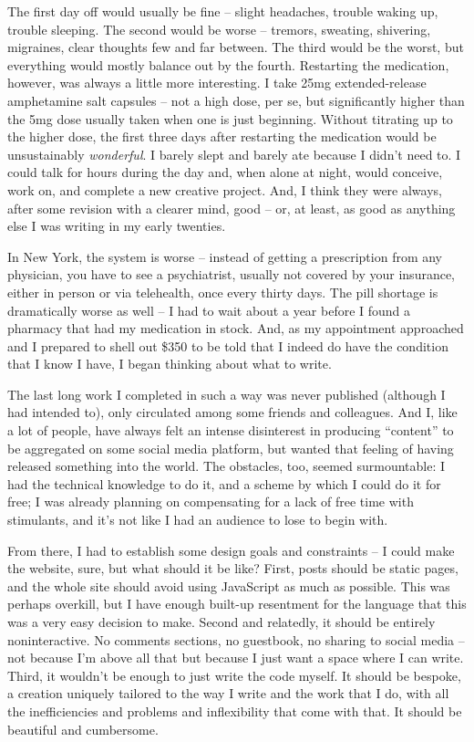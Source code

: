 \documentclass[11pt]{article}
\begin{document}
    The first day off would usually be fine -- slight headaches, trouble waking up, trouble sleeping. The second would be worse -- tremors, sweating, shivering, migraines, clear thoughts few and far between. The third would be the worst, but everything would mostly balance out by the fourth. Restarting the medication, however, was always a little more interesting. I take 25mg extended-release amphetamine salt capsules -- not a high dose, per se, but significantly higher than the 5mg dose usually taken when one is just beginning. Without titrating up to the higher dose, the first three days after restarting the medication would be unsustainably \textit{wonderful}. I barely slept and barely ate because I didn't need to. I could talk for hours during the day and, when alone at night, would conceive, work on, and complete a new creative project. And, I think they were always, after some revision with a clearer mind, good -- or, at least, as good as anything else I was writing in my early twenties. 

    In New York, the system is worse -- instead of getting a prescription from any physician, you have to see a psychiatrist, usually not covered by your insurance, either in person or via telehealth, once every thirty days. The pill shortage is dramatically worse as well -- I had to wait about a year before I found a pharmacy that had my medication in stock. And, as my appointment approached and I prepared to shell out \$350 to be told that I indeed do have the condition that I know I have, I began thinking about what to write.

    The last long work I completed in such a way was never published (although I had intended to), only circulated among some friends and colleagues. And I, like a lot of people, have always felt an intense disinterest in producing ``content'' to be aggregated on some social media platform, but wanted that feeling of having released something into the world. The obstacles, too, seemed surmountable: I had the technical knowledge to do it, and a scheme by which I could do it for free; I was already planning on compensating for a lack of free time with stimulants, and it's not like I had an audience to lose to begin with. 

    From there, I had to establish some design goals and constraints -- I could make the website, sure, but what should it be like? First, posts should be static pages, and the whole site should avoid using JavaScript as much as possible. This was perhaps overkill, but I have enough built-up resentment for the language that this was a very easy decision to make. Second and relatedly, it should be entirely noninteractive. No comments sections, no guestbook, no sharing to social media -- not because I'm above all that but because I just want a space where I can write. Third, it wouldn't be enough to just write the code myself. It should be bespoke, a creation uniquely tailored to the way I write and the work that I do, with all the inefficiencies and problems and inflexibility that come with that. It should be beautiful and cumbersome. 
\end{document}
